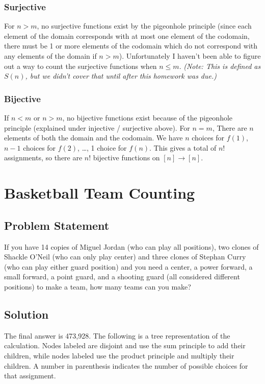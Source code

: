 \documentclass[12pt]{article}
\begin{document}
\subsubsection*{Surjective}
For $n > m$, no surjective functions exist by the pigeonhole principle (since each element of the domain corresponds with at most one element of the codomain, there must be 1 or more elements of the codomain which do not correspond with any elements of the domain if $n > m$). Unfortunately I haven't been able to figure out a way to count the surjective functions when $n \leq m$. \emph{(Note: This is defined as $S(n)$, but we didn't cover that until after this homework was due.)}

\subsubsection*{Bijective}

If $n < m$ or $n > m$, no bijective functions exist because of the pigeonhole principle (explained under injective / surjective above). For $n = m$, There are $n$ elements of both the domain and the codomain. We have $n$ choices for $f(1)$, $n-1$ choices for $f(2)$, \ldots, 1 choice for $f(n)$. This gives a total of $n!$ assignments, so there are $n!$ bijective functions on $[n] \rightarrow [n]$.

\section{Basketball Team Counting}

\subsection*{Problem Statement}
If you have 14 copies of Miguel Jordan (who can play all positions), two clones of Shackle O'Neil (who can only play center) and three clones of Stephan Curry (who can play either guard position) and you need a center, a power forward, a small forward, a point guard, and a shooting guard (all considered different positions) to make a team, how many teams can you make?
\subsection*{Solution}

The final answer is 473,928. The following is a tree representation of the calculation. Nodes labeled  are disjoint and use the sum principle to add their children, while nodes labeled  use the product principle and multiply their children. A number in parenthesis indicates the number of possible choices for that assignment. 
\end{document}
